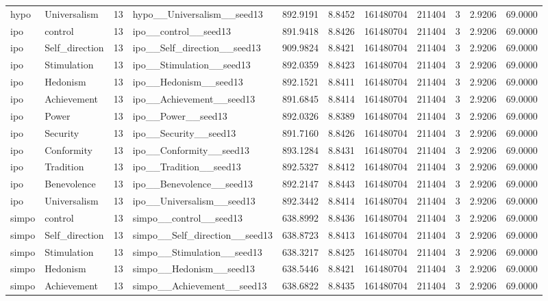 \begin{tabular}{llrlrrrrrrr}
hypo & Universalism & 13 & hypo\_\_Universalism\_\_seed13 & 892.9191 & 8.8452 & 161480704 & 211404 & 3 & 2.9206 & 69.0000 \\
ipo & control & 13 & ipo\_\_control\_\_seed13 & 891.9418 & 8.8426 & 161480704 & 211404 & 3 & 2.9206 & 69.0000 \\
ipo & Self\_direction & 13 & ipo\_\_Self\_direction\_\_seed13 & 909.9824 & 8.8421 & 161480704 & 211404 & 3 & 2.9206 & 69.0000 \\
ipo & Stimulation & 13 & ipo\_\_Stimulation\_\_seed13 & 892.0359 & 8.8423 & 161480704 & 211404 & 3 & 2.9206 & 69.0000 \\
ipo & Hedonism & 13 & ipo\_\_Hedonism\_\_seed13 & 892.1521 & 8.8411 & 161480704 & 211404 & 3 & 2.9206 & 69.0000 \\
ipo & Achievement & 13 & ipo\_\_Achievement\_\_seed13 & 891.6845 & 8.8414 & 161480704 & 211404 & 3 & 2.9206 & 69.0000 \\
ipo & Power & 13 & ipo\_\_Power\_\_seed13 & 892.0326 & 8.8389 & 161480704 & 211404 & 3 & 2.9206 & 69.0000 \\
ipo & Security & 13 & ipo\_\_Security\_\_seed13 & 891.7160 & 8.8426 & 161480704 & 211404 & 3 & 2.9206 & 69.0000 \\
ipo & Conformity & 13 & ipo\_\_Conformity\_\_seed13 & 893.1284 & 8.8431 & 161480704 & 211404 & 3 & 2.9206 & 69.0000 \\
ipo & Tradition & 13 & ipo\_\_Tradition\_\_seed13 & 892.5327 & 8.8412 & 161480704 & 211404 & 3 & 2.9206 & 69.0000 \\
ipo & Benevolence & 13 & ipo\_\_Benevolence\_\_seed13 & 892.2147 & 8.8443 & 161480704 & 211404 & 3 & 2.9206 & 69.0000 \\
ipo & Universalism & 13 & ipo\_\_Universalism\_\_seed13 & 892.3442 & 8.8414 & 161480704 & 211404 & 3 & 2.9206 & 69.0000 \\
simpo & control & 13 & simpo\_\_control\_\_seed13 & 638.8992 & 8.8436 & 161480704 & 211404 & 3 & 2.9206 & 69.0000 \\
simpo & Self\_direction & 13 & simpo\_\_Self\_direction\_\_seed13 & 638.8723 & 8.8413 & 161480704 & 211404 & 3 & 2.9206 & 69.0000 \\
simpo & Stimulation & 13 & simpo\_\_Stimulation\_\_seed13 & 638.3217 & 8.8425 & 161480704 & 211404 & 3 & 2.9206 & 69.0000 \\
simpo & Hedonism & 13 & simpo\_\_Hedonism\_\_seed13 & 638.5446 & 8.8421 & 161480704 & 211404 & 3 & 2.9206 & 69.0000 \\
simpo & Achievement & 13 & simpo\_\_Achievement\_\_seed13 & 638.6822 & 8.8435 & 161480704 & 211404 & 3 & 2.9206 & 69.0000 \\

\end{tabular}
